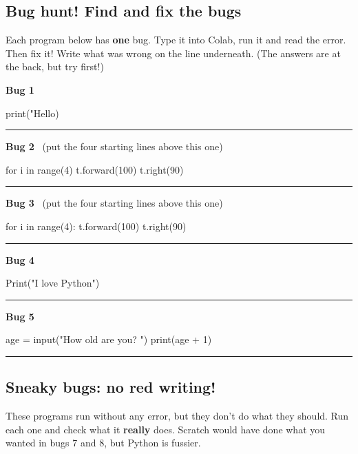 \documentclass[12pt,a4paper]{article}
\begin{document}
\subsection*{Bug hunt! Find and fix the bugs}
\begingroup\setlength{\parskip}{3pt}
Each program below has \textbf{one} bug. Type it into Colab, run it and read the error. Then fix it! Write what was wrong on the line underneath. (The answers are at the back, but try first!)

\textbf{Bug 1}
\begin{code}
print("Hello)
\end{code}
\rule{\linewidth}{0.4pt}\par\vspace{2pt}

\textbf{Bug 2} \ (put the four starting lines above this one)
\begin{code}
for i in range(4)
    t.forward(100)
    t.right(90)
\end{code}
\rule{\linewidth}{0.4pt}\par\vspace{2pt}

\textbf{Bug 3} \ (put the four starting lines above this one)
\begin{code}
for i in range(4):
t.forward(100)
t.right(90)
\end{code}
\rule{\linewidth}{0.4pt}\par\vspace{2pt}

\textbf{Bug 4}
\begin{code}
Print("I love Python")
\end{code}
\rule{\linewidth}{0.4pt}\par\vspace{2pt}

\textbf{Bug 5}
\begin{code}
age = input("How old are you? ")
print(age + 1)
\end{code}
\rule{\linewidth}{0.4pt}\par\vspace{2pt}

\subsection*{Sneaky bugs: no red writing!}
These programs run without any error, but they don't do what they should. Run each one and check what it \textbf{really} does. Scratch would have done what you wanted in bugs 7 and 8, but Python is fussier.
\end{document}
